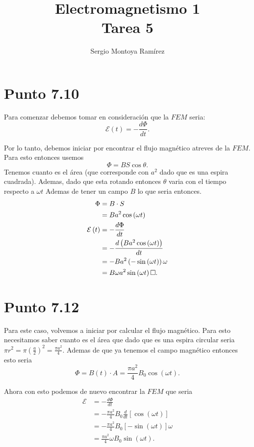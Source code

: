\documentclass{report}
\title{\Huge{Electromagnetismo 1}\\Tarea 5}
\author{\huge{Sergio Montoya Ramírez}}
\date{}
\renewcommand{\qed}{\hfill\square}
\begin{document}
\maketitle
\newpage%
\tableofcontents
\pagebreak

\chapter{Punto 7.10}

Para comenzar debemos tomar en consideración que la $FEM$ seria: \[
  \mathcal{E}\left( t \right) = - \frac{d\Phi}{dt}
.\] 

Por lo tanto, debemos iniciar por encontrar el flujo magnético atreves de la $FEM$. Para esto entonces usemos \[
\Phi = BS\cos\theta
.\] Tenemos cuanto es el área (que corresponde con $a^2$ dado que es una espira cuadrada). Ademas, dado que esta rotando entonces $\theta$ varia con el tiempo respecto a  $\omega t$ Ademas de tener un campo  $B$ lo que seria entonces.
 \begin{align*}
   \Phi &= B\cdot S\\
	&= B a^2 \cos\left( \omega t \right)\\
   \mathcal{E}\left( t \right) &= - \frac{d\Phi}{dt}\\
			       &= - \frac{d\left( B a^2 \cos\left( \omega t \right)  \right) }{dt}\\
			       &= - B a^2 \left( - \sin\left( \omega t \right)  \right) \omega\\
			       &= B \omega a^2 \sin\left( \omega t \right) \qed
.\end{align*}

\chapter{Punto 7.12}

Para este caso, volvemos a iniciar por calcular el flujo magnético. Para esto necesitamos saber cuanto es el área que dado que es una espira circular seria $\pi r^2 = \pi \left( \frac{a}{2} \right)^2 = \frac{\pi a^2}{4}$. Ademas de que ya tenemos el campo magnético entonces esto seria \[
  \Phi = B(t)\cdot A = \frac{\pi a^2}{4}B_0 \cos\left( \omega t \right) 
.\]

Ahora con esto podemos de nuevo encontrar la $FEM$ que seria
 \begin{align*}
   \mathcal{E} &= - \frac{d\Phi}{dt}\\
	       &= - \frac{\pi a^2}{4}B_0 \frac{d}{dt}\left[ \cos\left( \omega t \right)  \right] \\
	       &= - \frac{\pi a^2}{4}B_0 \left[ -\sin\left( \omega t \right)  \right]\omega \\
	       &= \frac{\pi a^2}{4}\omega B_0 \sin\left( \omega t \right)
.\end{align*}
\end{document}
